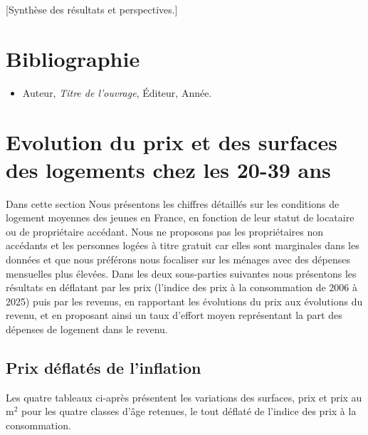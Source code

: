 \documentclass[12pt,a4paper]{article}
\begin{document}
	[Synthèse des résultats et perspectives.]
	
	\section*{Bibliographie}
	
	\begin{itemize}[leftmargin=1.2em]
		\item Auteur, \textit{Titre de l'ouvrage}, Éditeur, Année.
	\end{itemize}

\newpage

	\appendix
	
	\section{Evolution du prix et des surfaces des logements chez les 20-39 ans}\label{annexe1}
	
	Dans cette section Nous présentons les chiffres détaillés sur les conditions de logement moyennes des jeunes en France, en fonction de leur statut de locataire ou de propriétaire accédant. Nous ne proposons pas les propriétaires non accédants et les personnes logées à titre gratuit car elles sont marginales dans les données et que nous préférons nous focaliser sur les ménages avec des dépenses mensuelles plus élevées. Dans les deux sous-parties suivantes nous présentons les résultats en déflatant par les prix (l'indice des prix à la consommation de 2006 à 2025) puis par les revenus, en rapportant les évolutions du prix aux évolutions du revenu, et en proposant ainsi un taux d'effort moyen représentant la part des dépenses de logement dans le revenu. 
	
	\subsection{Prix déflatés de l'inflation}\label{annexe1a}
	
	Les quatre tableaux ci-après présentent les variations des surfaces, prix et prix au m$^2$ pour les quatre classes d'âge retenues, le tout déflaté de l'indice des prix à la consommation. 
	
\end{document}
